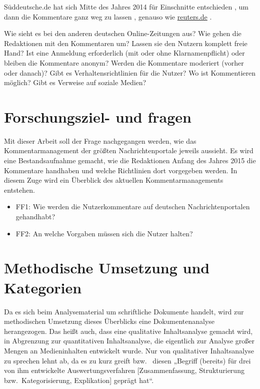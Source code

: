 Süddeutsche.de hat sich Mitte des Jahres 2014 für Einschnitte entschieden
\autocite{mark}, um dann die Kommentare ganz weg zu lassen \autocite{fromm},
genauso wie \url{reuters.de} \autocite{standard}.


Wie sieht es bei den anderen deutschen Online-Zeitungen aus? Wie gehen die
Redaktionen mit den Kommentaren um? Lassen sie den Nutzern komplett freie Hand?
Ist eine Anmeldung erforderlich (mit oder ohne Klarnamenpflicht) oder bleiben
die Kommentare anonym? Werden die Kommentare moderiert (vorher oder danach)?
Gibt es Verhaltensrichtlinien für die Nutzer? Wo ist Kommentieren möglich? Gibt
es Verweise auf soziale Medien?


\section{Forschungsziel- und fragen}

Mit dieser Arbeit soll der Frage nachgegangen werden, wie das
Kommentarmanagement der größten Nachrichtenportale jeweils aussieht. Es wird
eine Bestandsaufnahme gemacht, wie die Redaktionen Anfang des Jahres 2015 die
Kommentare handhaben und welche Richtlinien dort vorgegeben werden. In diesem
Zuge wird ein Überblick des aktuellen Kommentarmanagements entstehen.

\begin{itemize} \em
  \item FF1: Wie werden die Nutzerkommentare auf deutschen Nachrichtenportalen
    gehandhabt?
  \item FF2: An welche Vorgaben müssen sich die Nutzer halten?
\end{itemize}


\section{Methodische Umsetzung und Kategorien}

Da es sich beim Analysematerial um schriftliche Dokumente handelt, wird zur
methodischen Umsetzung dieses Überblicks eine Dokumentenanalyse herangezogen.
Das heißt auch, dass eine qualitative Inhaltsanalyse gemacht wird, in Abgrenzung
zur quantitativen Inhaltsanalyse, die eigentlich zur Analyse großer Mengen an
Medieninhalten entwickelt wurde. Nur von qualitativer Inhaltsanalyse zu sprechen
lehnt \textcite{kunzler} ab, da es zu kurz greift bzw.~\textcite{mayring} diesen
„Begriff (bereits) für drei von ihm entwickelte Auswertungsverfahren
[Zusammenfassung, Strukturierung bzw.~Kategorisierung, Explikation] geprägt hat“.

